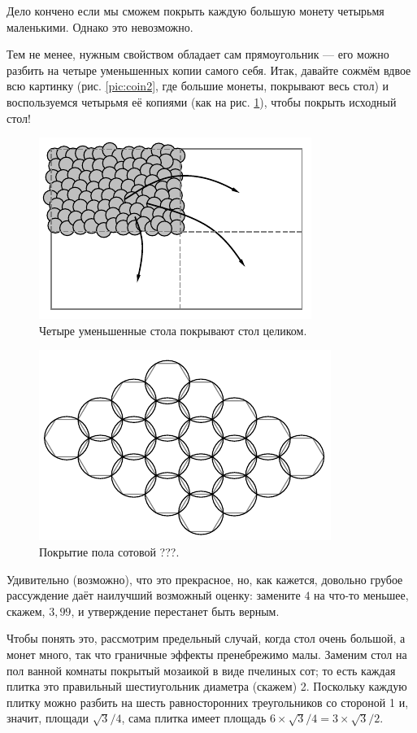 Дело кончено если мы сможем покрыть каждую большую монету четырьмя маленькими.
Однако это невозможно.

Тем не менее, нужным свойством обладает сам прямоугольник --- его можно разбить на четыре уменьшенных копии самого себя.
Итак, давайте сожмём вдвое всю картинку (рис. \ref{pic:coin2}, где большие монеты, покрывают весь стол) и воспользуемся четырьмя её копиями (как на рис. \ref{pic:coin3}), чтобы покрыть исходный стол!


\begin{figure}[t!]
\centering
\includegraphics[scale=1]{pics/coin3}
\caption{Четыре уменьшенные стола покрывают стол целиком.}
\label{pic:coin3}
\end{figure}

\begin{figure}[b!]
\centering
\includegraphics[scale=1]{pics/coin4}
\caption{Покрытие пола  сотовой ???.}
\label{pic:coin4}
\end{figure}

Удивительно (возможно), что это прекрасное, но, как кажется, довольно грубое рассуждение даёт наилучший возможный оценку: замените $4$ на что-то меньшее, скажем, $3{,}99$, и утверждение перестанет быть верным.

Чтобы понять это, рассмотрим предельный случай, когда стол очень большой, а монет много, так что граничные эффекты пренебрежимо малы.
Заменим стол на пол ванной комнаты покрытый мозаикой в виде пчелиных сот;
то есть каждая плитка это правильный шестиугольник диаметра (скажем) 2.
Поскольку каждую плитку можно разбить на шесть равносторонних треугольников со стороной 1 и, значит, площади $\sqrt{3}/4$, сама плитка имеет площадь $6\times\sqrt{3}/4=3\times\sqrt{3}/2$.

